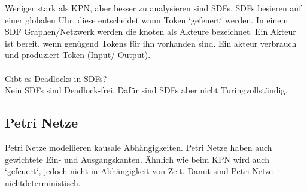 Weniger stark als KPN, aber besser zu analysieren sind SDFs.
SDFs besieren auf einer globalen Uhr, diese entscheidet wann Token `gefeuert` werden.
In einem SDF Graphen/Netzwerk werden die knoten als Akteure bezeichnet.
Ein Akteur ist bereit, wenn genügend Tokens für ihn vorhanden sind.
Ein akteur verbrauch und produziert Token (Input/ Output).
\\ \\
Gibt es Deadlocks in SDFs?\\
Nein SDFs sind Deadlock-frei.
Dafür sind SDFs aber nicht Turingvollständig.



\subsection{Petri Netze}

Petri Netze modellieren kausale Abhängigkeiten.
Petri Netze haben auch gewichtete Ein- und Ausgangskanten.
Ähnlich wie beim KPN wird auch `gefeuert`, jedoch nicht in Abhängigkeit von Zeit.
Damit sind Petri Netze nichtdeterministisch.
